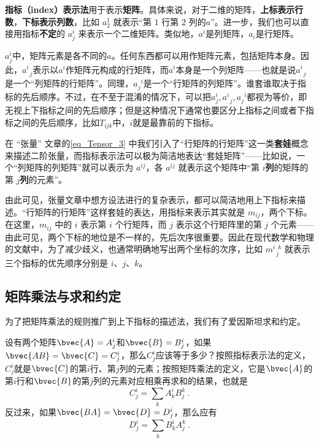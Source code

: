 \textbf{指标（index）表示法}用于表示\textbf{矩阵}。具体来说，对于二维的矩阵，\textbf{上标表示行数}，\textbf{下标表示列数}，比如 $a^1_2$ 就表示“第 $1$ 行第 $2$ 列的$a$”。进一步，我们也可以直接用指标\textbf{不定}的 $a^i_j$ 来表示一个二维矩阵。类似地，$a^i$是列矩阵，$a_i$是行矩阵。

$a^i_j$中，矩阵元素是各不同的$a$。任何东西都可以用作矩阵元素，包括矩阵本身。因此，$a^{i}_{\phantom{1}j}$表示以$a^i$作矩阵元构成的行矩阵，而$a^i$本身是一个列矩阵——也就是说$a^i_{\phantom{1}j}$是一个“列矩阵的行矩阵”。同理，$a^{\phantom{1}i}_j$是一个“行矩阵的列矩阵”。谁套谁取决于指标的先后顺序。不过，在不至于混淆的情况下，可以把$a^i_j, a^i_{\phantom{1}j}, a^{\phantom{1}i}_j$都视为等价，即无视上下指标之间的先后顺序；但是这种情况下通常也要区分上指标之间或者下指标之间的先后顺序，比如$T_{ijk}$中，$i$就是最靠前的下指标。

在 “张量” 文章的\autoref{eq_Tensor_3} 中我们引入了“行矩阵的行矩阵”这一类\textbf{套娃}概念来描述二阶张量，而指标表示法可以极为简洁地表达“套娃矩阵”——比如说，一个“列矩阵的列矩阵”就可以表示为 $a^{ij}$，各 $a^{ij}$ 就表示这个矩阵中“第 $i$\textbf{列}的矩阵的第 $j$\textbf{列}的元素”。

由此可见，张量文章中想方设法进行的复杂表示，都可以简洁地用上下指标来描述。“行矩阵的行矩阵”这样套娃的表达，用指标来表示其实就是 $m_{ij}$，两个下标。在这里，$m_{ij}$ 中的 $i$ 表示第 $i$ 个行矩阵，而 $j$ 表示这个行矩阵里的第 $j$ 个元素——由此可见，两个下标的地位是不一样的，先后次序很重要。因此在现代数学和物理的文献中，为了减少歧义，也通常明确地写出两个坐标的次序，比如 $m^{i\phantom{1}k}_{\phantom{1}j}$ 就表示三个指标的优先顺序分别是 $i$、$j$、$k$。




\subsection{矩阵乘法与求和约定}




为了把矩阵乘法的规则推广到上下指标的描述法，我们有了爱因斯坦求和约定。


设有两个矩阵$\bvec{A}=A^i_j$和$\bvec{B}=B^i_j$，如果$\bvec{AB}=\bvec{C}=C^i_j$，那么$C^i_j$应该等于多少？按照指标表示法的定义，$C^i_j$就是$\bvec{C}$的第$i$行、第$j$列的元素；按照矩阵乘法的定义，它是$\bvec{A}$的第$i$行和$\bvec{B}$的第$j$列的元素对应相乘再求和的结果，也就是
\begin{equation}
C^i_j = \sum_k A^i_k B^k_j~. 
\end{equation}
反过来，如果$\bvec{BA}=\bvec{D}=D^i_j$，那么应有
\begin{equation}
D^i_j = \sum_k B^i_k A^k_j~. 
\end{equation}


